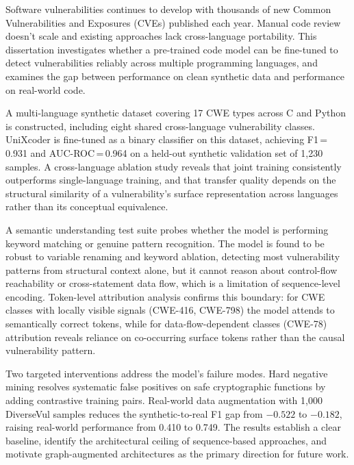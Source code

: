 Software vulnerabilities continues to develop with thousands of new Common Vulnerabilities
and Exposures (CVEs) published each year. Manual code review doesn't scale and existing
approaches lack cross-language portability. This dissertation investigates whether a pre-trained
code model can be fine-tuned to detect vulnerabilities reliably across multiple programming
languages, and examines the gap between performance on clean synthetic data and performance
on real-world code.

A multi-language synthetic dataset covering 17 CWE types across C and Python is constructed,
including eight shared cross-language vulnerability classes. UniXcoder is fine-tuned as a
binary classifier on this dataset, achieving F1\,=\,0.931 and AUC-ROC\,=\,0.964 on a
held-out synthetic validation set of 1{,}230 samples. A cross-language ablation study reveals
that joint training consistently outperforms single-language training, and that transfer
quality depends on the structural similarity of a vulnerability's surface representation
across languages rather than its conceptual equivalence.

A semantic understanding test suite probes whether the model is performing keyword matching
or genuine pattern recognition. The model is found to be robust to variable renaming and
keyword ablation, detecting most vulnerability patterns from structural context alone,
but it cannot reason about control-flow reachability or cross-statement data flow,
which is a limitation of sequence-level encoding. Token-level attribution analysis confirms
this boundary: for CWE classes with locally visible signals (CWE-416, CWE-798) the model
attends to semantically correct tokens, while for data-flow-dependent classes (CWE-78)
attribution reveals reliance on co-occurring surface tokens rather than the causal
vulnerability pattern.

Two targeted interventions address the model's failure modes. Hard negative mining resolves
systematic false positives on safe cryptographic functions by adding contrastive training
pairs. Real-world data augmentation with 1{,}000 DiverseVul samples reduces the
synthetic-to-real F1 gap from $-0.522$ to $-0.182$, raising real-world performance from
0.410 to 0.749. The results establish a clear baseline, identify the architectural ceiling of
sequence-based approaches, and motivate graph-augmented architectures as the primary
direction for future work.
